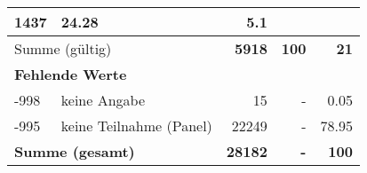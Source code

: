 \begin{longtable}{lXrrr}
       \num{1437} &
       \num[round-mode=places,round-precision=2]{24.28} &
         \num[round-mode=places,round-precision=2]{5.1} \\
     \midrule
     \multicolumn{2}{l}{Summe (gültig)} &
       \textbf{\num{5918}} &
     \textbf{\num{100}} &
       \textbf{\num[round-mode=places,round-precision=2]{21}} \\
     \multicolumn{5}{l}{\textbf{Fehlende Werte}}\\
       -998 &
       keine Angabe &
         \num{15} &
        - &
         \num[round-mode=places,round-precision=2]{0.05} \\
       -995 &
       keine Teilnahme (Panel) &
         \num{22249} &
        - &
         \num[round-mode=places,round-precision=2]{78.95} \\
     \midrule
     \multicolumn{2}{l}{\textbf{Summe (gesamt)}} &
          \textbf{\num{28182}} &
        \textbf{-} &
        \textbf{\num{100}} \\
     \bottomrule
     \end{longtable}
     
